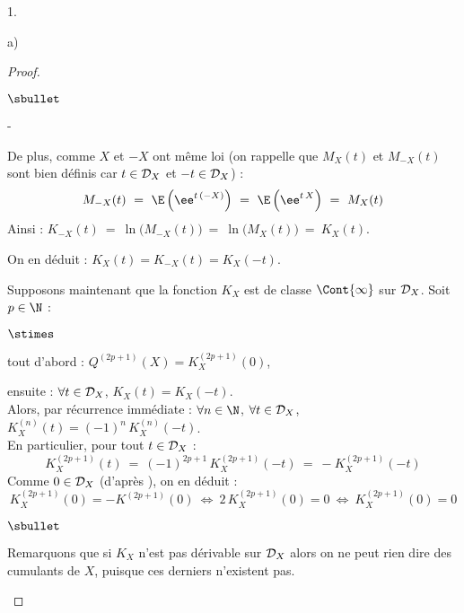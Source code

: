 \documentclass[11pt]{article}%
\begin{document}
\begin{noliste}{1.}
\begin{noliste}{a)}
\begin{proof}
\begin{noliste}{$\sbullet$}
\begin{noliste}{-}
        \item De plus, comme $X$ et $-X$ ont même loi (on rappelle que
          $M_X(t)$ et $M_{-X}(t)$ sont bien définis car $t \in {\cal
            D}_X$ et $-t \in {\cal D}_X$) :
          \[
            M_{-X}(t) \ = \ \E\left(\ee^{t \, (-X)}\right) \ = \
            \E\left(\ee^{t \, X}\right) \ = \ M_X(t)
          \]
          Ainsi : $K_{-X}(t) \ = \ \ln\big(M_{-X}(t)\big) \ = \
          \ln\big(M_X(t)\big) \ = \ K_X(t)$.
        \end{noliste}
        On en déduit : $K_X(t) = K_{-X}(t) = K_X(-t)$.
        
      \item Supposons maintenant que la fonction $K_X$ est de classe
        $\Cont{\infty}$ sur ${\cal D}_X$. Soit $p \in \N$ :
        \begin{noliste}{$\stimes$}
        \item tout d'abord : $Q^{(2p+1)}(X) = K_X^{(2p+1)}(0)$,
          
        \item ensuite : $\forall t \in {\cal D}_X$,
          $K_X(t) = K_X(-t)$.\\
          Alors, par récurrence immédiate : $\forall n \in \N$,
          $\forall t \in {\cal D}_X$,
          $K_X^{(n)}(t) = (-1)^n \, K_X^{(n)}(-t)$.\\
          En particulier, pour tout $t \in {\cal D}_X$ :
          \[
            K_X^{(2p+1)}(t) \ = \ (-1)^{2p+1} \, K_X^{(2p+1)}(-t) \ =
            \ -K_X^{(2p+1)}(-t)
          \]
          Comme $0 \in {\cal D}_X$ (d'après ), on en déduit :
          \[
            K_X^{(2p+1)}(0) = -K^{(2p+1)}(0) \ \Leftrightarrow \ 2 \,
            K_X^{(2p+1)}(0) = 0 \ \Leftrightarrow \ K_X^{(2p+1)}(0) =
            0
          \]
        \end{noliste}
      \end{noliste}


      \newpage

      
      \begin{remarkL}{.98}
        \begin{noliste}{$\sbullet$}
        \item Remarquons que si $K_X$ n'est pas dérivable sur ${\cal
            D}_X$ alors on ne peut rien dire des cumulants de $X$,
          puisque ces derniers n'existent pas.
          

\end{noliste}
\end{remarkL}
\end{proof}
\end{noliste}
\end{noliste}
\end{document}
